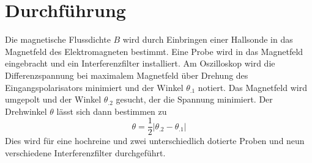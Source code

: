 \section{Durchführung}
\label{sec:Durchführung}
Die magnetische Flussdichte $B$ wird durch Einbringen einer Hallsonde in das Magnetfeld des Elektromagneten bestimmt.
Eine Probe wird in das Magnetfeld eingebracht und ein Interferenzfilter installiert.
Am Oszilloskop wird die Differenzspannung bei maximalem Magnetfeld über Drehung des Eingangspolarisators minimiert und der Winkel $\theta_.1$ notiert. Das Magnetfeld wird umgepolt und der Winkel $\theta_.2$ gesucht, der die Spannung minimiert.
Der Drehwinkel $\theta$ lässt sich dann bestimmen zu
\begin{equation}
\theta = \frac{1}{2} |\theta_.2 - \theta_.1|\label{eq:dth}
\end{equation}
Dies wird für eine hochreine und zwei unterschiedlich dotierte Proben und neun verschiedene Interferenzfilter durchgeführt.

